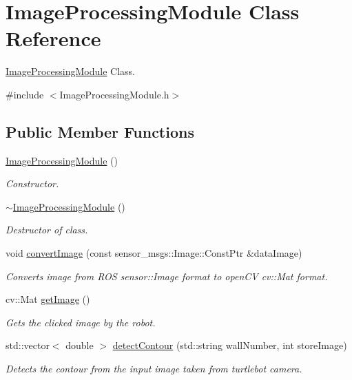 \hypertarget{class_image_processing_module}{}\section{Image\+Processing\+Module Class Reference}
\label{class_image_processing_module}


\mbox{\hyperlink{class_image_processing_module}{Image\+Processing\+Module}} Class.  




{\ttfamily \#include $<$Image\+Processing\+Module.\+h$>$}

\subsection*{Public Member Functions}
\begin{DoxyCompactItemize}
\item 
\mbox{\hyperlink{class_image_processing_module_a2c35e6db14ed55d6fc612076aaf1324b}{Image\+Processing\+Module}} ()
\begin{DoxyCompactList}\small\item\em Constructor. \end{DoxyCompactList}\item 
\mbox{\hyperlink{class_image_processing_module_a5f5c41eb1df297c230c777a2cac6e56a}{$\sim$\+Image\+Processing\+Module}} ()
\begin{DoxyCompactList}\small\item\em Destructor of class. \end{DoxyCompactList}\item 
void \mbox{\hyperlink{class_image_processing_module_aad792e04a69c27e628510d316d6fa0be}{convert\+Image}} (const sensor\+\_\+msgs\+::\+Image\+::\+Const\+Ptr \&data\+Image)
\begin{DoxyCompactList}\small\item\em Converts image from R\+OS sensor\+::\+Image format to open\+CV cv\+::\+Mat format. \end{DoxyCompactList}\item 
cv\+::\+Mat \mbox{\hyperlink{class_image_processing_module_a445c2a3e209f7d7d757dc68beb9c0829}{get\+Image}} ()
\begin{DoxyCompactList}\small\item\em Gets the clicked image by the robot. \end{DoxyCompactList}\item 
std\+::vector$<$ double $>$ \mbox{\hyperlink{class_image_processing_module_afd8cec561f96d6d5528b641fdb48e43e}{detect\+Contour}} (std\+::string wall\+Number, int store\+Image)
\begin{DoxyCompactList}\small\item\em Detects the contour from the input image taken from turtlebot camera. \end{DoxyCompactList}\end{DoxyCompactItemize}



